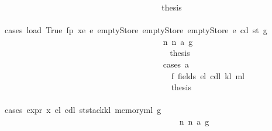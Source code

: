 \begin{isabellebody}
\ \ \ \ \ \ \ \ \ \ \ \ \ \ \ \ \ \ \ \ \ \ \ \ \ \ \ \ \ \ \ \ \ \ \ \ \isamarkupfalse%
\ \isamarkupfalse%
\ {\isacharquery}{\kern0pt}thesis\isanewline
\ \ \ \ \ \ \ \ \ \ \ \ \ \ \ \ \ \ \ \ \ \ \ \ \ \ \ \ \ \ \ \ \ \ \ \ \isamarkupfalse%
\ {\isacharparenleft}{\kern0pt}cases\ {\isachardoublequoteopen}load\ True\ fp\ xe\ e{\isacharprime}{\kern0pt}\ emptyStore\ emptyStore\ emptyStore\ e\ cd\ st\ g{\isacharprime}{\kern0pt}{\isachardoublequoteclose}{\isacharparenright}{\kern0pt}\isanewline
\ \ \ \ \ \ \ \ \ \ \ \ \ \ \ \ \ \ \ \ \ \ \ \ \ \ \ \ \ \ \ \ \ \ \ \ \ \ \isamarkupfalse%
\ n{}{\isacharcolon}{\kern0pt}\ {\isacharparenleft}{\kern0pt}n\ a\ g{\isacharprime}{\kern0pt}{\isacharprime}{\kern0pt}{\isacharparenright}{\kern0pt}\isanewline
\ \ \ \ \ \ \ \ \ \ \ \ \ \ \ \ \ \ \ \ \ \ \ \ \ \ \ \ \ \ \ \ \ \ \ \ \ \ \isamarkupfalse%
\ \isamarkupfalse%
\ {\isacharquery}{\kern0pt}thesis\isanewline
\ \ \ \ \ \ \ \ \ \ \ \ \ \ \ \ \ \ \ \ \ \ \ \ \ \ \ \ \ \ \ \ \ \ \ \ \ \ \isamarkupfalse%
\ {\isacharparenleft}{\kern0pt}cases\ a{\isacharparenright}{\kern0pt}\isanewline
\ \ \ \ \ \ \ \ \ \ \ \ \ \ \ \ \ \ \ \ \ \ \ \ \ \ \ \ \ \ \ \ \ \ \ \ \ \ \ \ \isamarkupfalse%
\ f{}{\isacharcolon}{\kern0pt}\ {\isacharparenleft}{\kern0pt}fields\ e\isactrlsub l\ cd\isactrlsub l\ k\isactrlsub l\ m\isactrlsub l{\isacharparenright}{\kern0pt}\isanewline
\ \ \ \ \ \ \ \ \ \ \ \ \ \ \ \ \ \ \ \ \ \ \ \ \ \ \ \ \ \ \ \ \ \ \ \ \ \ \ \ \isamarkupfalse%
\ {\isacharquery}{\kern0pt}thesis\isanewline
\ \ \ \ \ \ \ \ \ \ \ \ \ \ \ \ \ \ \ \ \ \ \ \ \ \ \ \ \ \ \ \ \ \ \ \ \ \ \ \ \isamarkupfalse%
\ {\isacharparenleft}{\kern0pt}cases\ {\isachardoublequoteopen}expr\ x\ e\isactrlsub l\ cd\isactrlsub l\ {\isacharparenleft}{\kern0pt}st{\isasymlparr}stack{\isacharcolon}{\kern0pt}{\isacharequal}{\kern0pt}k\isactrlsub l{\isacharcomma}{\kern0pt}\ memory{\isacharcolon}{\kern0pt}{\isacharequal}{\kern0pt}m\isactrlsub l{\isasymrparr}{\isacharparenright}{\kern0pt}\ g{\isacharprime}{\kern0pt}{\isacharprime}{\kern0pt}{\isachardoublequoteclose}{\isacharparenright}{\kern0pt}\isanewline
\ \ \ \ \ \ \ \ \ \ \ \ \ \ \ \ \ \ \ \ \ \ \ \ \ \ \ \ \ \ \ \ \ \ \ \ \ \ \ \ \ \ \isamarkupfalse%
\ n{}{\isacharcolon}{\kern0pt}\ {\isacharparenleft}{\kern0pt}n\ a\ g{\isacharprime}{\kern0pt}{\isacharprime}{\kern0pt}{\isacharprime}{\kern0pt}{\isacharparenright}{\kern0pt}\isanewline
\ \ \ \ \ \ \ \ \ \ \ \ \ \ \ \ \ \ \ \ \ \ \ \ \ \ \ \ \ \ \ \ \ \ \ \ \ \ \ \ \ \ \isamarkupfalse%

\end{isabellebody}
